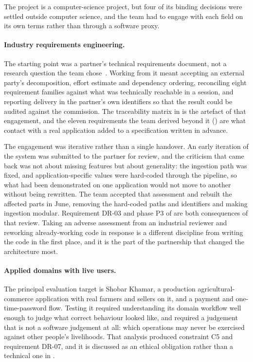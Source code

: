 The project is a computer-science project, but four of its binding decisions
were settled outside computer science, and the team had to engage with each
field on its own terms rather than through a software proxy.

\paragraph{Industry requirements engineering.} The starting point was a
partner's technical requirements document, not a research question the team
chose~\cite{etatr}. Working from it meant accepting an external party's
decomposition, effort estimate and dependency ordering, reconciling eight
requirement families against what was technically reachable in a session, and
reporting delivery in the partner's own identifiers so that the result could be
audited against the commission. The traceability matrix in
 is the artefact of that engagement, and the eleven
requirements the team derived beyond it () are what
contact with a real application added to a specification written in advance.

The engagement was iterative rather than a single handover. An early iteration
of the system was submitted to the partner for review, and the criticism that
came back was not about missing features but about generality: the ingestion
path was fixed, and application-specific values were hard-coded through the
pipeline, so what had been demonstrated on one application would not move to
another without being rewritten. The team accepted that assessment and rebuilt
the affected parts in June, removing the hard-coded paths and identifiers and
making ingestion modular. Requirement DR-03 and phase P3 of 
are both consequences of that review. Taking an adverse assessment from an
industrial reviewer and reworking already-working code in response is a
different discipline from writing the code in the first place, and it is the
part of the partnership that changed the architecture most.

\paragraph{Applied domains with live users.} The principal evaluation target
is Shobar Khamar, a production agricultural-commerce application with real farmers and sellers
on it, and a payment and one-time-password flow. Testing it required
understanding its domain workflow well enough to judge what correct behaviour
looked like, and required a judgement that is not a software judgement at all:
which operations may never be exercised against other people's livelihoods.
That analysis produced constraint C5 and requirement DR-07, and it is discussed
as an ethical obligation rather than a technical one in .

